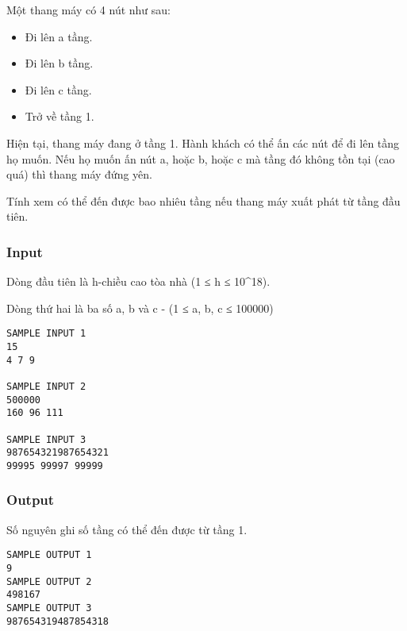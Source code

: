 

Một thang máy có 4 nút như sau:
\begin{itemize}
	\item Đi lên a tầng.
	\item Đi lên b tầng.
	\item Đi lên c tầng.
	\item Trở về tầng 1.
\end{itemize}

Hiện tại, thang máy đang ở tầng 1. Hành khách có thể ấn các nút để đi lên tầng họ muốn. Nếu họ muốn ấn nút a, hoặc b, hoặc c mà tầng đó không tồn tại (cao quá) thì thang máy đứng yên.

Tính xem có thể đến được bao nhiêu tầng nếu thang máy xuất phát từ tầng đầu tiên.

\subsubsection{Input}

Dòng đầu tiên là h-chiều cao tòa nhà (1 ≤ h ≤ 10\textasciicircum18).

Dòng thứ hai là ba số a, b và c - (1 ≤ a, b, c ≤ 100000)
\begin{verbatim}
SAMPLE INPUT 1
15
4 7 9

SAMPLE INPUT 2
500000
160 96 111

SAMPLE INPUT 3
987654321987654321
99995 99997 99999

\end{verbatim}

\subsubsection{Output}

Số nguyên ghi số tầng có thể đến được từ tầng 1.
\begin{verbatim}
SAMPLE OUTPUT 1
9
SAMPLE OUTPUT 2
498167
SAMPLE OUTPUT 3
987654319487854318
\end{verbatim}

 